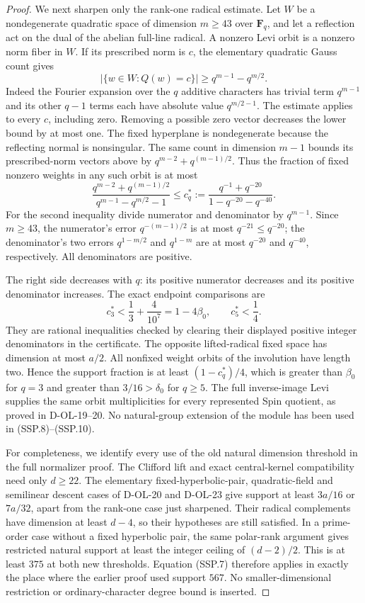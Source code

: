 \begin{proof}
We next sharpen only the rank-one radical estimate.
Let $W$ be a nondegenerate quadratic space of dimension $m\ge43$
over $\mathbf F_q$, and let a reflection act on the dual of
the abelian full-line radical.  A nonzero Levi orbit is a
nonzero norm fiber in $W$.  If its prescribed norm is $c$,
the elementary quadratic Gauss count gives
\[
 |\{w\in W:Q(w)=c\}|\ge q^{m-1}-q^{m/2}.
 \tag{SSP.8}
\]
Indeed the Fourier expansion over the $q$ additive characters
has trivial term $q^{m-1}$ and its other $q-1$ terms each
have absolute value $q^{m/2-1}$.  The estimate applies
to every $c$, including zero.  Removing a possible zero vector
decreases the lower bound by at most one.
The fixed hyperplane is nondegenerate because the reflecting
normal is nonsingular.  The same count in dimension $m-1$
bounds its prescribed-norm vectors above by
$q^{m-2}+q^{(m-1)/2}$.
Thus the fraction of fixed nonzero weights in any such orbit is at most
\[
 \frac{q^{m-2}+q^{(m-1)/2}}
      {q^{m-1}-q^{m/2}-1}
 \le c_q^*:=\frac{q^{-1}+q^{-20}}
                      {1-q^{-20}-q^{-40}}.
 \tag{SSP.9}
\]
For the second inequality divide numerator and denominator
by $q^{m-1}$.  Since $m\ge43$, the numerator's error
$q^{-(m-1)/2}$ is at most $q^{-21}\le q^{-20}$;
the denominator's two errors $q^{1-m/2}$ and $q^{1-m}$
are at most $q^{-20}$ and $q^{-40}$, respectively.
All denominators are positive.

The right side decreases with $q$: its positive numerator
decreases and its positive denominator increases.
The exact endpoint comparisons are
\[
 c_3^*<\frac13+\frac4{10^7}=1-4\beta_0,
 \qquad c_5^*<\frac14.
 \tag{SSP.10}
\]
They are rational inequalities checked by clearing their
displayed positive integer denominators in the certificate.
The opposite lifted-radical fixed space has dimension at
most $a/2$.  All nonfixed weight orbits of the involution
have length two.  Hence the support fraction is at least
$(1-c_q^*)/4$, which is greater than $\beta_0$ for $q=3$
and greater than $3/16>\delta_0$ for $q\ge5$.
The full inverse-image Levi supplies the same orbit
multiplicities for every represented Spin quotient, as proved
in D-OL-19--20.  No natural-group extension of the module
has been used in (SSP.8)--(SSP.10).

For completeness, we identify every use of the old natural
dimension threshold in the full normalizer proof.
The Clifford lift and exact central-kernel compatibility
need only $d\ge22$.
The elementary fixed-hyperbolic-pair, quadratic-field and
semilinear descent cases of D-OL-20 and D-OL-23 give support
at least $3a/16$ or $7a/32$, apart from the rank-one case
just sharpened.  Their radical complements have dimension
at least $d-4$, so their hypotheses are still satisfied.
In a prime-order case without a fixed hyperbolic pair,
the same polar-rank argument gives restricted natural
support at least the integer ceiling of $(d-2)/2$.
This is at least $375$ at both new thresholds.
Equation (SSP.7) therefore applies in exactly the place
where the earlier proof used support $567$.
No smaller-dimensional restriction or ordinary-character
degree bound is inserted.


\end{proof}
